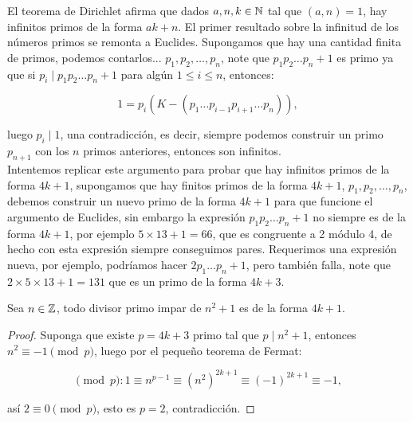 
\thispagestyle{empty}
\vspace{-0.7cm}


El teorema de Dirichlet afirma que dados $a,n,k \in \mathbb{N}$ tal que $(a,n)=1$, hay infinitos primos de la forma $ak+n$. El primer resultado sobre la infinitud de los números primos se remonta a Euclides. Supongamos que hay una cantidad  finita de primos, podemos contarlos... $p_1,p_2,\ldots,p_n$, note que $p_1p_2\ldots p_n+1$ es primo ya que si $p_i\mid p_1p_2\ldots p_n+ 1$ para algún $1\leq i\leq n$, entonces:

$$1=p_i(K-(p_1\ldots p_{i-1}p_{i+1}\ldots p_n)),$$

luego $p_i\mid 1$, una contradicción, es decir, siempre podemos construir un primo $p_{n+1}$ con los $n$ primos anteriores, entonces son infinitos.\\

Intentemos replicar este argumento para probar que hay infinitos primos de la forma $4k+1$, supongamos que hay finitos primos de la forma $4k+1$, $p_1,p_2,\ldots,p_n$, debemos construir un nuevo primo de  la forma $4k+1$ para que funcione el argumento de Euclides, sin embargo la expresión  $p_1p_2\ldots p_n+1$ no siempre es de la forma $4k+1$, por ejemplo $5\times13+1=66$, que es congruente a 2 módulo 4, de hecho con esta expresión siempre conseguimos pares. Requerimos una expresión nueva, por ejemplo, podríamos hacer $2p_1\ldots p_n+1$, pero también falla, note que $2\times5\times13+1=131$ que es un primo de la forma $4k+3$.\\

\begin{prop}

Sea $n\in \mathbb{Z}$, todo divisor primo impar de $n^2+1$ es de la forma $4k+1$. 
\end{prop}

\begin{proof}
Suponga que existe $p=4k+3$ primo tal que $p\mid n^2+1$, entonces $n^2\equiv -1 \pmod{p}$, luego por el pequeño teorema de Fermat:

$$\pmod{p}: 1\equiv n^{ p-1}\equiv (n^{2})^{2k+1}\equiv (-1)^{2k+1}\equiv -1,$$

así $2\equiv 0 \pmod{p}$, esto es $p=2$, contradicción.

\end{proof}

